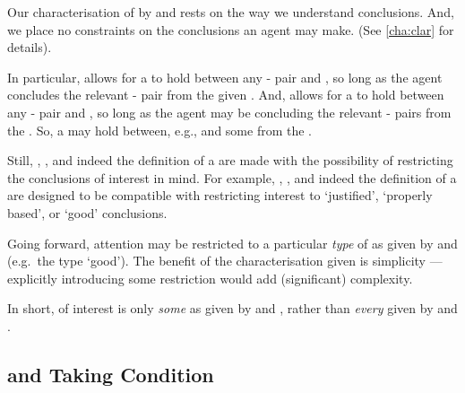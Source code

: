 \begin{note}
  Our characterisation of  by \supportI{} and \supportII{} rests on the way we understand conclusions.
  And, we place no constraints on the conclusions an agent may make.
  (See \autoref{cha:clar} for details).

  In particular, \supportI{} allows for a \fingfr{} to hold between any - pair and , so long as the agent concludes the relevant - pair from the given \pool{}.
  And, \supportII{} allows for a \fingfr{} to hold between any - pair and , so long as the agent may be concluding the relevant - pairs from the \pool{}.
  So, a \fingfr{} may hold between, e.g.,  and some \pool{} from the \agpe{}.

  Still, \supportI{}, \supportII{}, and indeed the definition of a \fc{} are made with the possibility of restricting the conclusions of interest in mind.
  For example, \supportI{}, \supportII{}, and indeed the definition of a \fc{} are designed to be compatible with restricting interest to `justified', `properly based', or `good' conclusions.

  Going forward, attention may be restricted to a particular \emph{type} of \fingfr{} as given by \supportI{} and \supportII{} (e.g.\ the type `good').
  The benefit of the characterisation given is simplicity --- explicitly introducing some restriction would add (significant) complexity.

  In short, of interest is only \emph{some}  as given by \supportI{} and \supportII{}, rather than \emph{every} \fingfr{} given by \supportI{} and \supportII{}.
\end{note}




\subsection*{\supportI{} and \citeauthor{Boghossian:2014aa} Taking Condition}



